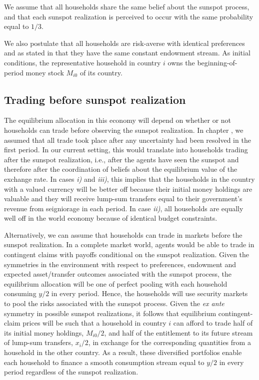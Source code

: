\noindent We assume that all households share the same belief
about the sunspot process, and that each sunspot realization is
perceived to occur with the same probability equal to $1/3$.

We also postulate that all households are risk-averse with
identical preferences and as stated in  that they have
the same constant endowment stream. As initial conditions, the
representative household in country $i$ owns the
beginning-of-period money stock $M_{i0}$ of its country.


\subsection{Trading before sunspot realization}
The equilibrium allocation in this economy will depend on whether
or not households can trade before observing the sunspot
realization. In chapter , we assumed that all trade
took place after any uncertainty had been resolved in the first
period. In our current setting, this would translate into
households trading after the sunspot realization, i.e., after the
agents have seen the sunspot and therefore after the coordination
of beliefs about the equilibrium value of the exchange rate. In
cases {\it i)} and {\it iii)}, this implies that the households in
the country with a valued currency will be better off because
their initial money holdings are valuable and they will receive
lump-sum transfers equal to their government's revenue from
seigniorage in each period. In case {\it ii)}, all households are
equally well off in the world economy because of identical budget
constraints.

Alternatively, we can assume that households can trade in markets
before the sunspot realization. In a complete market world, agents
would be able to trade in contingent claims with payoffs
conditional on the sunspot realization. Given the symmetries in
the environment with respect to preferences, endowment and
expected asset/transfer outcomes associated with the sunspot
process, the equilibrium allocation will be one of perfect pooling
with each household consuming $y/2$ in every period. %
Hence, the
households will use security markets to pool the risks associated
with the sunspot process. Given the {\it ex ante} symmetry in
possible sunspot realizations, it follows that equilibrium
contingent-claim prices will be such that a household in country $i$
can afford to trade half of its initial money holdings, $M_{i0}/2$,
and half of the entitlement to its future stream of lump-sum
transfers, $x_i/2$,
in exchange for the corresponding quantities from a household in
the other country. As a result, these diversified portfolios enable each
household to finance a smooth consumption stream equal to $y/2$
in every period regardless of the sunspot realization.

